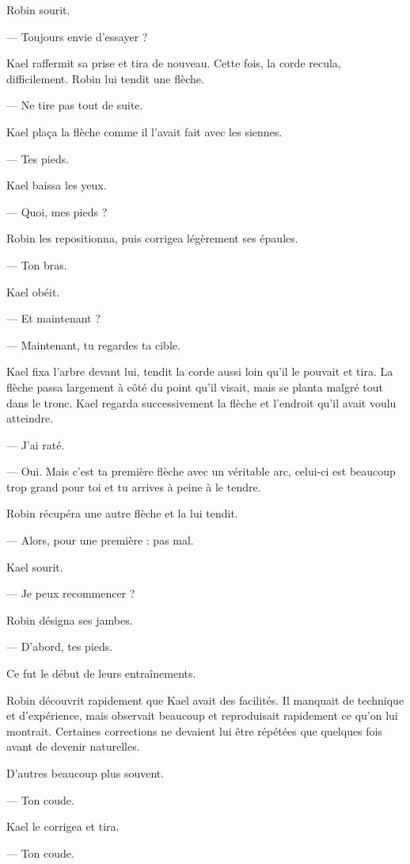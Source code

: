Robin sourit.

— Toujours envie d'essayer ?

Kael raffermit sa prise et tira de nouveau. Cette fois, la corde recula,
difficilement. Robin lui tendit une flèche.

— Ne tire pas tout de suite.

Kael plaça la flèche comme il l'avait fait avec les siennes.

— Tes pieds.

Kael baissa les yeux.

— Quoi, mes pieds ?

Robin les repositionna, puis corrigea légèrement ses épaules.

— Ton bras.

Kael obéit.

— Et maintenant ?

— Maintenant, tu regardes ta cible.

Kael fixa l'arbre devant lui, tendit la corde aussi loin qu'il le pouvait et
tira. La flèche passa largement à côté du point qu'il visait, mais se planta
malgré tout dans le tronc. Kael regarda successivement la flèche et l'endroit
qu'il avait voulu atteindre.

— J'ai raté.

— Oui. Mais c'est ta première flèche avec un véritable arc, celui-ci est
beaucoup trop grand pour toi et tu arrives à peine à le tendre.

Robin récupéra une autre flèche et la lui tendit.

— Alors, pour une première : pas mal.

Kael sourit.

— Je peux recommencer ?

Robin désigna ses jambes.

— D'abord, tes pieds.

Ce fut le début de leurs entraînements.

\scenebreak

Robin découvrit rapidement que Kael avait des facilités. Il manquait de
technique et d'expérience, mais observait beaucoup et reproduisait rapidement
ce qu'on lui montrait. Certaines corrections ne devaient lui être répétées que
quelques fois avant de devenir naturelles.

D'autres beaucoup plus souvent.

— Ton coude.

Kael le corrigea et tira.

— Ton coude.


